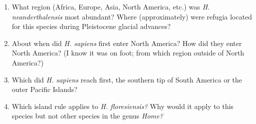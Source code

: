\documentclass[letterpaper]{tufte-handout}
\begin{document}
\begin{enumerate}
	\item What region (Africa, Europe, Asia, North America, etc.) was \textit{H. neanderthalensis} most abundant?  Where (approximately) were refugia located for this species during Pleistocene glacial advances?
	
	\item About when did \textit{H. sapiens} first enter North America? How did they enter North America? (I know it was on foot; from which region outside of North America?)
	
	\item Which did \textit{H. sapiens} reach first, the southern tip of South America or the outer Pacific Islands?
	
	\item Which island rule applies to \textit{H. floresiensis?} Why would it apply to this species but not other species in the genus \textit{Home?}
	
\end{enumerate}
\end{document}
